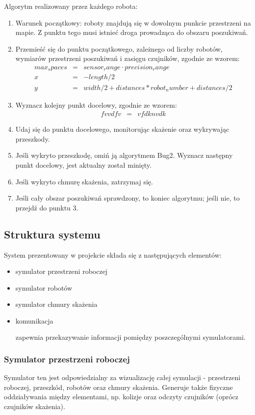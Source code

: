 \documentclass[a4paper, 12pt]{article}
\begin{document}
		Algorytm realizowany przez każdego robota:
		\begin{enumerate}
		\item Warunek początkowy: roboty znajdują się w dowolnym punkcie przestrzeni na mapie. Z punktu tego musi istnieć droga prowadząca do obszaru poszukiwań.
		\item Przemieść się do punktu początkowego, zależnego od liczby robotów, wymiarów przestrzeni poszukiwań i zasięgu czujników, zgodnie ze wzorem:		
		\begin{eqnarray}
		max_spaces &=& sensor_range \cdot precision_range \\
		x &=& -length / 2 \\
		y &=& width / 2 + distances * robot_number + distances / 2
		\end{eqnarray}
		\item Wyznacz kolejny punkt docelowy, zgodnie ze wzorem:
		\begin{eqnarray}
		fvvdfv&=& vfdknvdk
		\end{eqnarray}
		\item Udaj się do punktu docelowego, monitorując skażenie oraz wykrywając przeszkody.
		\item Jeśli wykryto przeszkodę, omiń ją algorytmem Bug2. Wyznacz następny punkt docelowy, jest aktualny został minięty.
		\item Jeśli wykryto chmurę skażenia, zatrzymaj się.
		\item Jeśli cały obszar poszukiwań sprawdzony, to koniec algorytmu; jeśli nie, to przejdź do punktu 3.
		\end{enumerate}
		
	
	\subsection{Struktura systemu}
	System prezentowany w projekcie składa się z następujących elementów:
	\begin{itemize}
	\item symulator przestrzeni roboczej	
	\item symulator robotów
	\item symulator chmury skażenia	
	\item komunikacja
	
	zapewnia przekazywanie informacji pomiędzy poszczególnymi symulatorami.
	\end{itemize}
	
	\subsubsection{Symulator przestrzeni roboczej}
	Symulator ten jest odpowiedzialny za wizualizację całej symulacji - przestrzeni roboczej, przeszkód, robotów oraz chmury skażenia. Generuje także fizyczne oddziaływania między elementami, np. kolizje oraz odczyty czujników (oprócz czujników skażenia).
	
\end{document}
